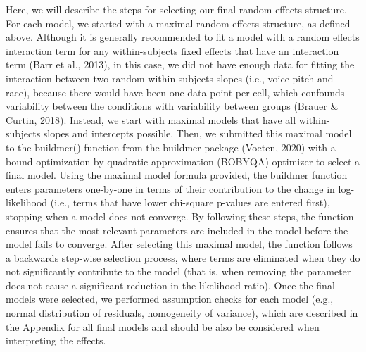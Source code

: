 \documentclass[
  english,
  man, noextraspace,floatsintext]{apa6}
\begin{document}
Here, we will describe the steps for selecting our final random effects structure. For each model, we started with a maximal random effects structure, as defined above. Although it is generally recommended to fit a model with a random effects interaction term for any within-subjects fixed effects that have an interaction term (Barr et al., 2013), in this case, we did not have enough data for fitting the interaction between two random within-subjects slopes (i.e., voice pitch and race), because there would have been one data point per cell, which confounds variability between the conditions with variability between groups (Brauer \& Curtin, 2018). Instead, we start with maximal models that have all within-subjects slopes and intercepts possible. Then, we submitted this maximal model to the buildmer() function from the buildmer package (Voeten, 2020) with a bound optimization by quadratic approximation (BOBYQA) optimizer to select a final model. Using the maximal model formula provided, the buildmer function enters parameters one-by-one in terms of their contribution to the change in log-likelihood (i.e., terms that have lower chi-square p-values are entered first), stopping when a model does not converge. By following these steps, the function ensures that the most relevant parameters are included in the model before the model fails to converge. After selecting this maximal model, the function follows a backwards step-wise selection process, where terms are eliminated when they do not significantly contribute to the model (that is, when removing the parameter does not cause a significant reduction in the likelihood-ratio). Once the final models were selected, we performed assumption checks for each model (e.g., normal distribution of residuals, homogeneity of variance), which are described in the Appendix for all final models and should be also be considered when interpreting the effects.
\end{document}
